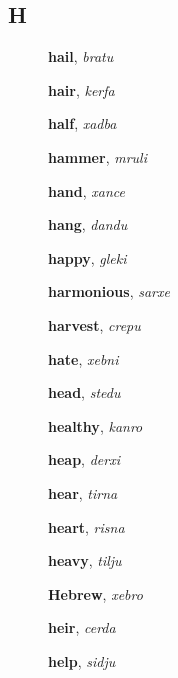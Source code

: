 \documentclass[12pt]{book}
\begin{document}
\subsection{H} %

\begin{description}

\item[ ] \textbf{hail}, \textit{bratu}

\item[ ] \textbf{hair}, \textit{kerfa}

\item[ ] \textbf{half}, \textit{xadba}

\item[ ] \textbf{hammer}, \textit{mruli}

\item[ ] \textbf{hand}, \textit{xance}

\item[ ] \textbf{hang}, \textit{dandu}

\item[ ] \textbf{happy}, \textit{gleki}

\item[ ] \textbf{harmonious}, \textit{sarxe}

\item[ ] \textbf{harvest}, \textit{crepu}

\item[ ] \textbf{hate}, \textit{xebni}

\item[ ] \textbf{head}, \textit{stedu}

\item[ ] \textbf{healthy}, \textit{kanro}

\item[ ] \textbf{heap}, \textit{derxi}

\item[ ] \textbf{hear}, \textit{tirna}

\item[ ] \textbf{heart}, \textit{risna}

\item[ ] \textbf{heavy}, \textit{tilju}

\item[ ] \textbf{Hebrew}, \textit{xebro}

\item[ ] \textbf{heir}, \textit{cerda}

\item[ ] \textbf{help}, \textit{sidju}


\end{description}
\end{document}
